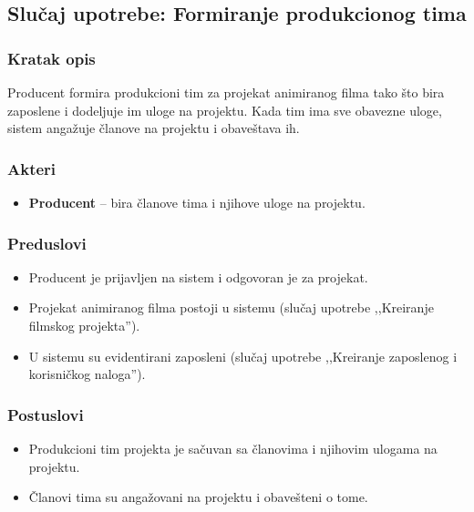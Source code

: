 \subsection{Slučaj upotrebe: Formiranje produkcionog tima}

\subsubsection*{Kratak opis}

Producent formira produkcioni tim za projekat animiranog filma tako što bira
zaposlene i dodeljuje im uloge na projektu. Kada tim ima sve obavezne uloge,
sistem angažuje članove na projektu i obaveštava ih.

\subsubsection*{Akteri}
\begin{itemize}
    \item \textbf{Producent} -- bira članove tima i njihove uloge na projektu.
\end{itemize}

\subsubsection*{Preduslovi}
\begin{itemize}
    \item Producent je prijavljen na sistem i odgovoran je za projekat.
    \item Projekat animiranog filma postoji u sistemu (slučaj upotrebe ,,Kreiranje filmskog projekta'').
    \item U sistemu su evidentirani zaposleni (slučaj upotrebe ,,Kreiranje zaposlenog i korisničkog naloga'').
\end{itemize}

\subsubsection*{Postuslovi}
\begin{itemize}
    \item Produkcioni tim projekta je sačuvan sa članovima i njihovim ulogama na projektu.
    \item Članovi tima su angažovani na projektu i obavešteni o tome.
\end{itemize}

